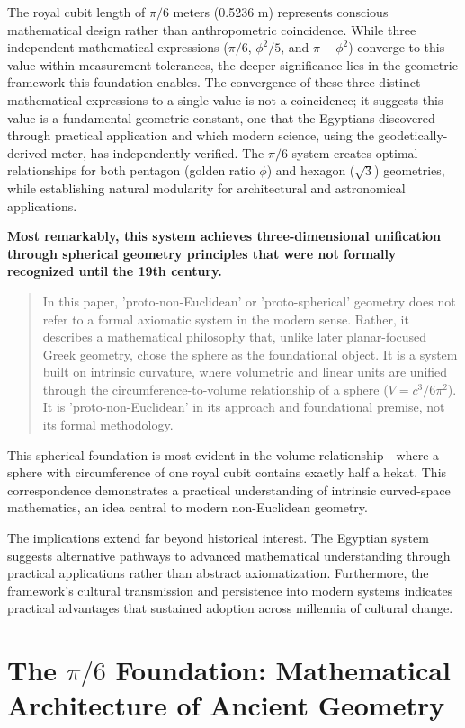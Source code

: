 \documentclass[11pt]{article}
\begin{document}
The royal cubit length of $\pi/6$ meters (0.5236 m) represents conscious mathematical design rather than anthropometric coincidence. While three independent mathematical expressions ($\pi/6$, $\phi^2/5$, and $\pi - \phi^2$) converge to this value within measurement tolerances, the deeper significance lies in the geometric framework this foundation enables. The convergence of these three distinct mathematical expressions to a single value is not a coincidence; it suggests this value is a fundamental geometric constant, one that the Egyptians discovered through practical application and which modern science, using the geodetically-derived meter, has independently verified. The $\pi/6$ system creates optimal relationships for both pentagon (golden ratio $\phi$) and hexagon ($\sqrt{3}$) geometries, while establishing natural modularity for architectural and astronomical applications.

\textbf{Most remarkably, this system achieves three-dimensional unification through spherical geometry principles that were not formally recognized until the 19th century.}
\begin{quote}
In this paper, 'proto-non-Euclidean' or 'proto-spherical' geometry does not refer to a formal axiomatic system in the modern sense. Rather, it describes a mathematical philosophy that, unlike later planar-focused Greek geometry, chose the sphere as the foundational object. It is a system built on intrinsic curvature, where volumetric and linear units are unified through the circumference-to-volume relationship of a sphere ($V = c^3/6\pi^2$). It is 'proto-non-Euclidean' in its approach and foundational premise, not its formal methodology.
\end{quote}

This spherical foundation is most evident in the volume relationship—where a sphere with circumference of one royal cubit contains exactly half a hekat. This correspondence demonstrates a practical understanding of intrinsic curved-space mathematics, an idea central to modern non-Euclidean geometry.

The implications extend far beyond historical interest. The Egyptian system suggests alternative pathways to advanced mathematical understanding through practical applications rather than abstract axiomatization. Furthermore, the framework's cultural transmission and persistence into modern systems indicates practical advantages that sustained adoption across millennia of cultural change.

\section{The \texorpdfstring{$\pi/6$}{pi/6} Foundation: Mathematical Architecture of Ancient Geometry}
\end{document}

